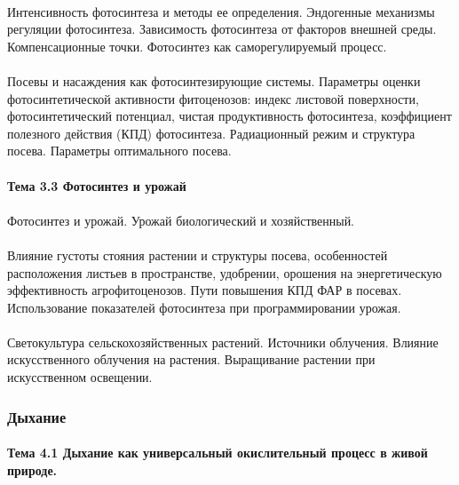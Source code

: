 \paragraph*{}Интенсивность фотосинтеза и методы ее определения. Эндогенные механизмы регуляции фотосинтеза. Зависимость фотосинтеза от факторов внешней среды. Компенсационные точки. Фотосинтез как саморегулируемый процесс.
\paragraph*{}Посевы и насаждения как фотосинтезирующие системы. Параметры оценки фотосинтетической активности фитоценозов: индекс листовой поверхности, фотосинтетический потенциал, чистая продуктивность фотосинтеза, коэффициент полезного действия (КПД) фотосинтеза. Радиационный режим и структура посева. Параметры оптимального посева.

\paragraph*{Тема 3.3 Фотосинтез и урожай}

\paragraph*{}Фотосинтез и урожай. Урожай биологический и хозяйственный.
\paragraph*{}Влияние густоты стояния растении и структуры посева, особенностей расположения листьев в пространстве, удобрении, орошения на энергетическую эффективность агрофитоценозов. Пути повышения КПД ФАР в посевах. Использование показателей фотосинтеза при программировании урожая.

\paragraph*{}Светокультура сельскохозяйственных растений. Источники облучения. Влияние искусственного облучения на растения. Выращивание растении при искусственном освещении.

\subsubsection{Дыхание}

\paragraph*{Тема 4.1 Дыхание как универсальный окислительный процесс в живой природе.}

